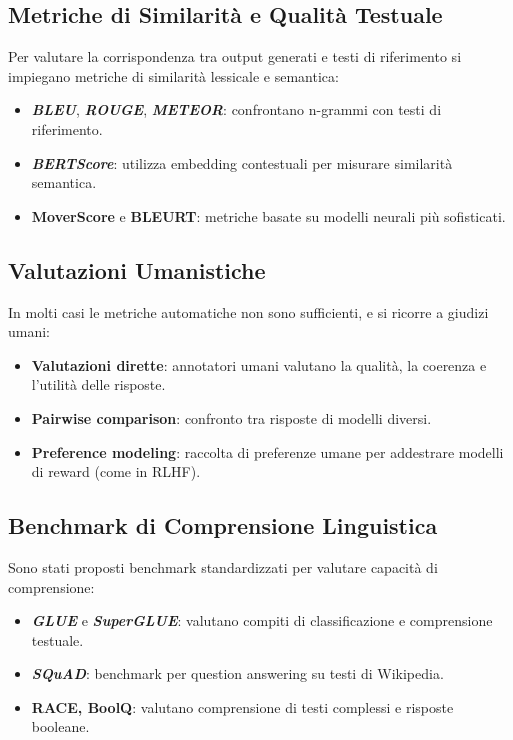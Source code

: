 \subsection{Metriche di Similarità e Qualità Testuale}
Per valutare la corrispondenza tra output generati e testi di riferimento 
si impiegano metriche di similarità lessicale e semantica:
\begin{itemize}
    \item \textbf{\textit{BLEU}}, \textbf{\textit{ROUGE}}, \textbf{\textit{METEOR}}: confrontano n-grammi con testi di riferimento.
    \item \textbf{\textit{BERTScore}}: utilizza embedding contestuali per misurare similarità semantica.
    \item \textbf{MoverScore} e \textbf{BLEURT}: metriche basate su modelli neurali più sofisticati.
\end{itemize}

\subsection{Valutazioni Umanistiche}
In molti casi le metriche automatiche non sono sufficienti, 
e si ricorre a giudizi umani:
\begin{itemize}
    \item \textbf{Valutazioni dirette}: annotatori umani valutano la qualità, la coerenza e l'utilità delle risposte.
    \item \textbf{Pairwise comparison}: confronto tra risposte di modelli diversi.
    \item \textbf{Preference modeling}: raccolta di preferenze umane per addestrare modelli di reward (come in RLHF).
\end{itemize}

\subsection{Benchmark di Comprensione Linguistica}
Sono stati proposti benchmark standardizzati per valutare capacità di comprensione:
\begin{itemize}
    \item \textbf{\textit{GLUE}} e \textbf{\textit{SuperGLUE}}: valutano compiti di classificazione e comprensione testuale.
    \item \textbf{\textit{SQuAD}}: benchmark per question answering su testi di Wikipedia.
    \item \textbf{RACE, BoolQ}: valutano comprensione di testi complessi e risposte booleane.
\end{itemize}

